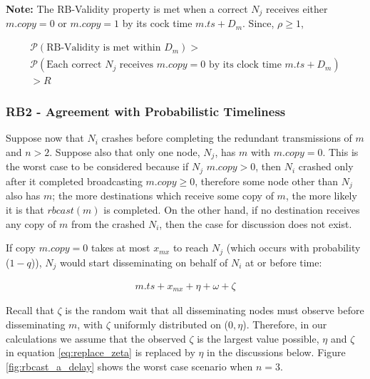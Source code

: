         \textbf{Note:} The RB-Validity property is met when a correct $N_j$ receives either $m.copy = 0$ or $m.copy = 1$ by its cock time $m.ts + D_m$.  Since, $\rho \geq 1$,
        
         \begin{equation}
        \begin{aligned}
                \mathcal{P}(\text{RB-Validity is met within } D_m) > \\ \mathcal{P}(\text{Each correct } N_j \text{ receives } m.copy = 0 \text{ by its clock time } m.ts+D_m) \\ > R
            \end{aligned}
        \end{equation}
        
        
    \subsubsection*{RB2 - Agreement with Probabilistic Timeliness}
    Suppose now that $N_i$ crashes before completing the redundant transmissions of $m$ and $n>2$.  Suppose also that only one node, $N_j$, has $m$ with $m.copy=0$. This is the worst case to be considered because if $N_j$ $m.copy>0$, then $N_i$ crashed only after it completed broadcasting $m.copy \geq 0$, therefore some node other than $N_j$ also has $m$; the more destinations which receive some copy of $m$, the more likely it is that $rbcast(m)$ is completed.  On the other hand, if no destination receives any copy of $m$ from the crashed $N_i$, then the case for discussion does not exist.  
    
    If copy $m.copy = 0$ takes at most $x_{mx}$ to reach $N_j$ (which occurs with probability ($1-q$)), $N_j$ would start disseminating on behalf of $N_i$ at or before time:
    
    \begin{equation}
    \label{eq:replace_zeta}
             \begin{aligned}
                m.ts+ x_{mx} + \eta + \omega +\zeta
             \end{aligned}
         \end{equation}    
    
    Recall that $\zeta$ is the random wait that all disseminating nodes must observe before disseminating $m$, with $\zeta$ uniformly distributed on ($0, \eta$).  Therefore, in our calculations we assume that the observed $\zeta$ is the largest value possible, $\eta$ and $\zeta$ in equation \ref{eq:replace_zeta} is replaced by $\eta$ in the discussions below.  Figure \ref{fig:rbcast_a_delay} shows the worst case scenario when $n=3$.  
    
